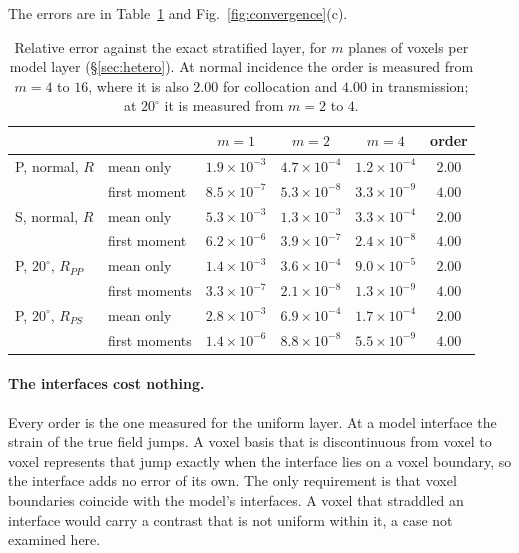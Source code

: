 \documentclass[11pt,a4paper]{article}
\begin{document}
The errors are in Table~\ref{tab:hetero} and Fig.~\ref{fig:convergence}(c).
\begin{table}[htbp]
\centering
\caption{Relative error against the exact stratified layer, for $m$ planes of voxels per model layer (\S\ref{sec:hetero}). At normal incidence the order is measured from $m=4$ to $16$, where it is also $2.00$ for collocation and $4.00$ in transmission; at $20^\circ$ it is measured from $m=2$ to $4$.}\label{tab:hetero}
\small
\begin{tabular}{@{}llcccc@{}}
\toprule
 & & $m=1$ & $m=2$ & $m=4$ & order \\
\midrule
P, normal, $R$ & mean only & $1.9\times10^{-3}$ & $4.7\times10^{-4}$ & $1.2\times10^{-4}$ & $2.00$ \\
 & first moment & $8.5\times10^{-7}$ & $5.3\times10^{-8}$ & $3.3\times10^{-9}$ & $4.00$ \\
S, normal, $R$ & mean only & $5.3\times10^{-3}$ & $1.3\times10^{-3}$ & $3.3\times10^{-4}$ & $2.00$ \\
 & first moment & $6.2\times10^{-6}$ & $3.9\times10^{-7}$ & $2.4\times10^{-8}$ & $4.00$ \\
P, $20^\circ$, $R_{PP}$ & mean only & $1.4\times10^{-3}$ & $3.6\times10^{-4}$ & $9.0\times10^{-5}$ & $2.00$ \\
 & first moments & $3.3\times10^{-7}$ & $2.1\times10^{-8}$ & $1.3\times10^{-9}$ & $4.00$ \\
P, $20^\circ$, $R_{PS}$ & mean only & $2.8\times10^{-3}$ & $6.9\times10^{-4}$ & $1.7\times10^{-4}$ & $2.00$ \\
 & first moments & $1.4\times10^{-6}$ & $8.8\times10^{-8}$ & $5.5\times10^{-9}$ & $4.00$ \\
\bottomrule
\end{tabular}
\end{table}

\paragraph{The interfaces cost nothing.} Every order is the one measured for the uniform layer. At a
model interface the strain of the true field jumps. A voxel basis that is discontinuous from voxel
to voxel represents that jump exactly when the interface lies on a voxel boundary, so the interface
adds no error of its own. The only requirement is that voxel boundaries coincide with the model's interfaces. A voxel
that straddled an interface would carry a contrast that is not uniform within it, a case not
examined here.
\end{document}
